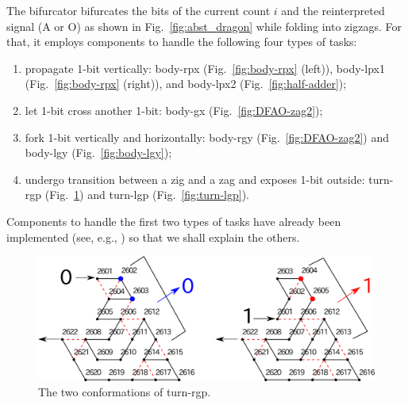 The bifurcator bifurcates the bits of the current count $i$ and the reinterpreted signal (A or O) as shown in Fig.~\ref{fig:abst_dragon} while folding into zigzags.
For that, it employs components to handle the following four types of tasks: 
\begin{enumerate}[itemsep=0pt]
\item propagate 1-bit vertically: body-rpx (Fig.~\ref{fig:body-rpx} (left)), body-lpx1 (Fig.~\ref{fig:body-rpx} (right)), and body-lpx2 (Fig.~\ref{fig:half-adder});
\item let 1-bit cross another 1-bit: body-gx (Fig.~\ref{fig:DFAO-zag2}); 
\item fork 1-bit vertically and horizontally: body-rgy (Fig.~\ref{fig:DFAO-zag2}) and body-lgy (Fig.~\ref{fig:body-lgy});  
\item undergo transition between a zig and a zag and exposes 1-bit outside: turn-rgp (Fig.~\ref{fig:turn-rgp}) and turn-lgp (Fig.~\ref{fig:turn-lgp}). 
\end{enumerate} 
Components to handle the first two types of tasks have already been implemented (see, e.g., \cite{HaKiOtSe2016}) so that we shall explain the others.


\begin{figure}
\vspace*{-5mm}
\centering
\includegraphics[width=\linewidth]{pic/turn-rgp.png}
\caption{The two conformations of turn-rgp.}
\label{fig:turn-rgp}
\vspace*{-3mm}
\end{figure}

